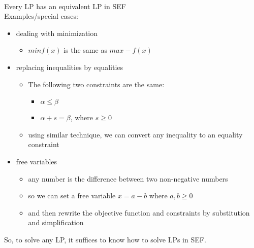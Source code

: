 \documentclass[letterpaper, 12pt]{article}
\newcommand{\red}[1]{{\color{red}{#1}}}
\begin{document}
    \pagebreak
    \red{\textbf{Theorem:}}\\
    Every LP has an equivalent LP in SEF\\
    Examples/special cases:\\
    \begin{itemize}
        \item dealing with minimization
        \begin{itemize}
            \item $min f(x)$ is the same as $max -f(x)$
        \end{itemize}
        \item replacing inequalities by equalities
        \begin{itemize}
            \item The following two constraints are the same:
            \begin{itemize}
                \item $\alpha \leq \beta$
                \item $\alpha + s = \beta$, where $s \geq 0$
            \end{itemize}
            \item using similar technique, we can convert any inequality to an equality constraint
        \end{itemize}
        \item free variables
        \begin{itemize}
            \item any number is the difference between two non-negative numbers
            \item so we can set a free variable $x = a - b$ where $a,b \geq 0$
            \item and then rewrite the objective function and constraints by substitution and simplification 
        \end{itemize}
    \end{itemize}

    \bigskip
    So, to solve any LP, it suffices to know how to solve LPs in SEF.

    \pagebreak
\end{document}
